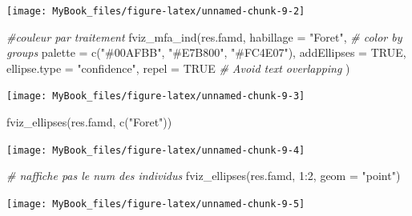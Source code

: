 \documentclass[
  12pt,
  american,
  a4paper,
  extrafontsizes,onecolumn,openright
  ]{memoir}
\newenvironment{Shaded}{\begin{snugshade}}{\end{snugshade}}
\newcommand{\AttributeTok}[1]{\textcolor[rgb]{0.77,0.63,0.00}{#1}}
\newcommand{\CommentTok}[1]{\textcolor[rgb]{0.56,0.35,0.01}{\textit{#1}}}
\newcommand{\ConstantTok}[1]{\textcolor[rgb]{0.00,0.00,0.00}{#1}}
\newcommand{\DecValTok}[1]{\textcolor[rgb]{0.00,0.00,0.81}{#1}}
\newcommand{\FunctionTok}[1]{\textcolor[rgb]{0.00,0.00,0.00}{#1}}
\newcommand{\NormalTok}[1]{#1}
\newcommand{\SpecialCharTok}[1]{\textcolor[rgb]{0.00,0.00,0.00}{#1}}
\newcommand{\StringTok}[1]{\textcolor[rgb]{0.31,0.60,0.02}{#1}}
\begin{document}
\begin{center}\texttt{[image: MyBook\_files/figure-latex/unnamed-chunk-9-2]} \end{center}

\begin{Shaded}
\begin{Highlighting}[]
\CommentTok{\#couleur par traitement}
\FunctionTok{fviz\_mfa\_ind}\NormalTok{(res.famd, }
             \AttributeTok{habillage =} \StringTok{"Foret"}\NormalTok{, }\CommentTok{\# color by groups }
             \AttributeTok{palette =} \FunctionTok{c}\NormalTok{(}\StringTok{"\#00AFBB"}\NormalTok{, }\StringTok{"\#E7B800"}\NormalTok{, }\StringTok{"\#FC4E07"}\NormalTok{),}
             \AttributeTok{addEllipses =} \ConstantTok{TRUE}\NormalTok{, }\AttributeTok{ellipse.type =} \StringTok{"confidence"}\NormalTok{, }
             \AttributeTok{repel =} \ConstantTok{TRUE} \CommentTok{\# Avoid text overlapping}
\NormalTok{             ) }
\end{Highlighting}
\end{Shaded}

\begin{center}\texttt{[image: MyBook\_files/figure-latex/unnamed-chunk-9-3]} \end{center}

\begin{Shaded}
\begin{Highlighting}[]
\FunctionTok{fviz\_ellipses}\NormalTok{(res.famd, }\FunctionTok{c}\NormalTok{(}\StringTok{"Foret"}\NormalTok{))}
\end{Highlighting}
\end{Shaded}

\begin{center}\texttt{[image: MyBook\_files/figure-latex/unnamed-chunk-9-4]} \end{center}

\begin{Shaded}
\begin{Highlighting}[]
\CommentTok{\# n\textquotesingle{}affiche pas le num des individus}
\FunctionTok{fviz\_ellipses}\NormalTok{(res.famd, }\DecValTok{1}\SpecialCharTok{:}\DecValTok{2}\NormalTok{, }\AttributeTok{geom =} \StringTok{"point"}\NormalTok{)}
\end{Highlighting}
\end{Shaded}

\begin{center}\texttt{[image: MyBook\_files/figure-latex/unnamed-chunk-9-5]} \end{center}
\end{document}

